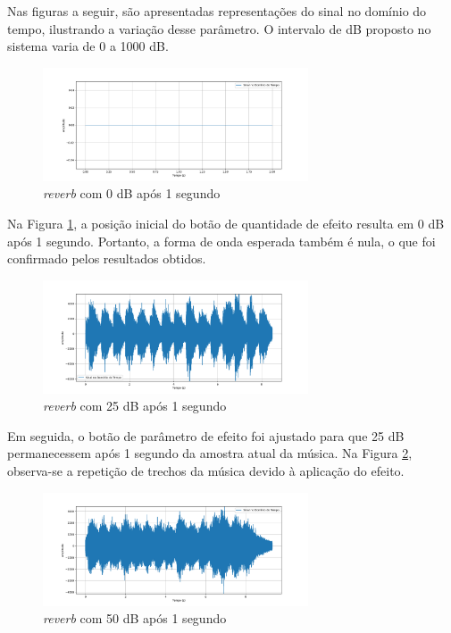 Nas figuras a seguir, são apresentadas representações do sinal no domínio do tempo, ilustrando a variação desse parâmetro. O intervalo de dB proposto no sistema varia de 0 a 1000 dB.


\begin{figure}[h]
    \centering
    \includegraphics[width=0.7\textwidth]{figuras/fig70.png}
    \caption{\textit{reverb} com 0 dB após 1 segundo}
    \label{fig70}
\end{figure}

Na Figura \ref{fig70}, a posição inicial do botão de quantidade de efeito resulta em 0 dB após 1 segundo. Portanto, a forma de onda esperada também é nula, o que foi confirmado pelos resultados obtidos.

\begin{figure}[h]
    \centering
    \includegraphics[width=0.7\textwidth]{figuras/fig71.png}
    \caption{\textit{reverb} com 25 dB após 1 segundo}
    \label{fig71}
\end{figure}

Em seguida, o botão de parâmetro de efeito foi ajustado para que 25 dB permanecessem após 1 segundo da amostra atual da música. Na Figura \ref{fig71}, observa-se a repetição de trechos da música devido à aplicação do efeito.


\newpage
\begin{figure}[h]
    \centering
    \includegraphics[width=0.7\textwidth]{figuras/fig72.png}
    \caption{\textit{reverb} com 50 dB após 1 segundo}
    \label{fig72}
\end{figure}


